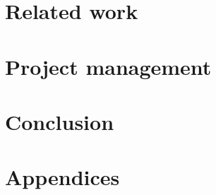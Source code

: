 \documentclass{article}
\begin{document}
\section{Related work}
\label{sec:related}


\section{Project management}

\section{Conclusion}
\label{sec:conclusion}


\newpage
\nocite{*}
\printbibliography[heading=bibintoc]

\newpage
\section{Appendices}
\label{sec:appendix}

\end{document}
